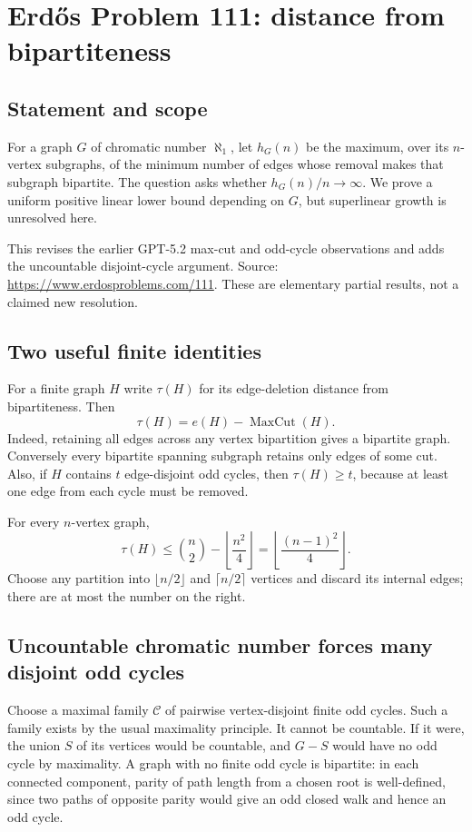 \section*{Erd\H{o}s Problem 111: distance from bipartiteness}
\subsection*{Statement and scope}
For a graph $G$ of chromatic number $\aleph_1$, let $h_G(n)$ be the maximum, over its $n$-vertex subgraphs, of the minimum number of edges whose removal makes that subgraph bipartite. The question asks whether $h_G(n)/n\to\infty$. We prove a uniform positive linear lower bound depending on $G$, but superlinear growth is unresolved here.

This revises the earlier GPT-5.2 max-cut and odd-cycle observations and adds the uncountable disjoint-cycle argument. Source: \url{https://www.erdosproblems.com/111}. These are elementary partial results, not a claimed new resolution.

\subsection*{Two useful finite identities}
For a finite graph $H$ write $\tau(H)$ for its edge-deletion distance from bipartiteness. Then
\[
 \tau(H)=e(H)-\operatorname{MaxCut}(H). \tag{1}
\]
Indeed, retaining all edges across any vertex bipartition gives a bipartite graph. Conversely every bipartite spanning subgraph retains only edges of some cut. Also, if $H$ contains $t$ edge-disjoint odd cycles, then $\tau(H)\ge t$, because at least one edge from each cycle must be removed.

For every $n$-vertex graph,
\[
 \tau(H)\le {n\choose2}-\left\lfloor\frac{n^2}{4}\right\rfloor
 =\left\lfloor\frac{(n-1)^2}{4}\right\rfloor. \tag{2}
\]
Choose any partition into $\lfloor n/2\rfloor$ and $\lceil n/2\rceil$ vertices and discard its internal edges; there are at most the number on the right.

\subsection*{Uncountable chromatic number forces many disjoint odd cycles}
Choose a maximal family $\mathcal C$ of pairwise vertex-disjoint finite odd cycles. Such a family exists by the usual maximality principle. It cannot be countable. If it were, the union $S$ of its vertices would be countable, and $G-S$ would have no odd cycle by maximality. A graph with no finite odd cycle is bipartite: in each connected component, parity of path length from a chosen root is well-defined, since two paths of opposite parity would give an odd closed walk and hence an odd cycle.

